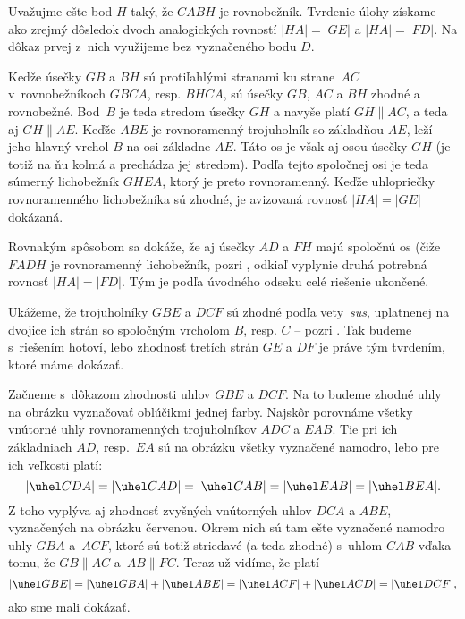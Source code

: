 {%
Uvažujme ešte bod $H$ taký, že $CABH$ je rovnobežník.
Tvrdenie úlohy získame ako zrejmý dôsledok dvoch analogických rovností
$|HA|=|GE|$ a $|HA|=|FD|$. Na dôkaz prvej z~nich
využijeme \obr{} bez vyznačeného bodu $D$.
%

Keďže úsečky $GB$ a $BH$ sú protiľahlými stranami ku strane~$AC$
v~rovnobežníkoch $GBCA$, resp. $BHCA$, sú úsečky $GB$, $AC$ a $BH$
zhodné a rovnobežné. Bod~$B$ je teda stredom úsečky $GH$ a navyše
platí $GH\parallel AC$, a teda aj $GH\parallel AE$. Keďže $ABE$ je
rovnoramenný trojuholník so základňou $AE$, leží jeho hlavný vrchol $B$
na osi základne $AE$. Táto os je však aj osou úsečky $GH$ (je
totiž na ňu kolmá a prechádza jej stredom). Podľa tejto spoločnej osi
je teda súmerný lichobežník $GHEA$, ktorý je preto rovnoramenný.
Keďže uhlopriečky rovnoramenného lichobežníka sú zhodné, je
avizovaná rovnosť $|HA|=|GE|$ dokázaná.

Rovnakým spôsobom sa dokáže, že aj úsečky $AD$ a $FH$ majú
spoločnú os (čiže $FADH$ je rovnoramenný lichobežník, pozri
\obr{}, odkiaľ vyplynie druhá potrebná rovnosť $|HA|=|FD|$.
Tým je podľa úvodného odseku celé riešenie ukončené.
%

\ineriesenie
Ukážeme, že trojuholníky $GBE$ a $DCF$ sú zhodné podľa
vety~\emph{sus}, uplatnenej na dvojice ich strán
so spoločným vrcholom $B$, resp. $C$ -- pozri \obr{}.
Tak budeme s~riešením hotoví, lebo zhodnosť tretích strán $GE$ a $DF$
je práve tým tvrdením, ktoré máme dokázať.
%

Začneme s~dôkazom zhodnosti uhlov $GBE$ a $DCF$. Na to budeme
zhodné uhly na obrázku vyznačovať oblúčikmi jednej farby. Najskôr
porovnáme všetky vnútorné uhly rovnoramenných trojuholníkov $ADC$ a $EAB$.
Tie pri ich základniach $AD$, resp.~$EA$ sú na
obrázku všetky vyznačené namodro, lebo pre ich veľkosti platí:
$$
|\uhel CDA|=|\uhel CAD|=|\uhel CAB|=|\uhel EAB|=|\uhel BEA|.
$$
Z toho vyplýva aj zhodnosť zvyšných vnútorných uhlov $DCA$ a $ABE$,
vyznačených na obrázku červenou. Okrem nich sú tam ešte
vyznačené namodro uhly $GBA$ a~$ACF$, ktoré sú totiž striedavé
(a teda zhodné) s~uhlom $CAB$ vďaka tomu, že $GB\parallel AC$ a~$AB\parallel FC$. Teraz už vidíme, že platí
$$
|\uhel GBE|=|\uhel GBA|+|\uhel ABE|=|\uhel ACF|+|\uhel ACD|=
|\uhel DCF|,
$$
ako sme mali dokázať.

}
